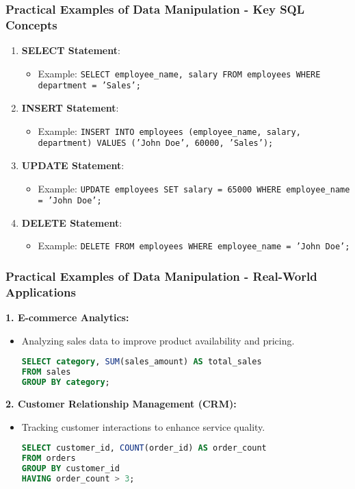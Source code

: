 \documentclass[aspectratio=169]{beamer}
\begin{document}
\begin{frame}[fragile]
    \frametitle{Practical Examples of Data Manipulation - Key SQL Concepts}
    \begin{enumerate}
        \item \textbf{SELECT Statement}:
        \begin{itemize}
            \item Example: \texttt{SELECT employee\_name, salary FROM employees WHERE department = 'Sales';}
        \end{itemize}
        
        \item \textbf{INSERT Statement}:
        \begin{itemize}
            \item Example: \texttt{INSERT INTO employees (employee\_name, salary, department) VALUES ('John Doe', 60000, 'Sales');}
        \end{itemize}
        
        \item \textbf{UPDATE Statement}:
        \begin{itemize}
            \item Example: \texttt{UPDATE employees SET salary = 65000 WHERE employee\_name = 'John Doe';}
        \end{itemize}
        
        \item \textbf{DELETE Statement}:
        \begin{itemize}
            \item Example: \texttt{DELETE FROM employees WHERE employee\_name = 'John Doe';}
        \end{itemize}
    \end{enumerate}
\end{frame}

\begin{frame}[fragile]
    \frametitle{Practical Examples of Data Manipulation - Real-World Applications}
    \textbf{1. E-commerce Analytics:}
    \begin{itemize}
        \item Analyzing sales data to improve product availability and pricing.
        \begin{lstlisting}[language=SQL]
SELECT category, SUM(sales_amount) AS total_sales
FROM sales
GROUP BY category;
        \end{lstlisting}
    \end{itemize}

    \textbf{2. Customer Relationship Management (CRM):}
    \begin{itemize}
        \item Tracking customer interactions to enhance service quality.
        \begin{lstlisting}[language=SQL]
SELECT customer_id, COUNT(order_id) AS order_count
FROM orders
GROUP BY customer_id
HAVING order_count > 3;
        \end{lstlisting}
    \end{itemize}
\end{frame}
\end{document}
